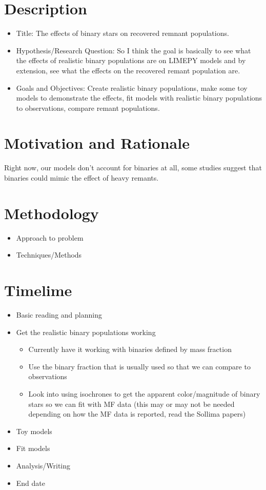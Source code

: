 \documentclass[12pt,letterpaper]{article}
\newcommand{\software}[1]{\textrm{\MakeUppercase{#1}}}
\begin{document}
\section{Description}
\begin{itemize}
	\item Title: The effects of binary stars on recovered remnant populations.
	\item Hypothesis/Research Question: So I think the goal is basically to see what the effects
	      of realistic binary populations are on \software{limepy} models and by extension, see
	      what the effects on the recovered remant population are.
	\item Goals and Objectives: Create realistic binary populations, make some toy models to
	      demonstrate the effects, fit models with realistic binary populations to observations,
	      compare remant populations.
\end{itemize}

\section{Motivation and Rationale}
Right now, our models don't account for binaries at all, some studies suggest that binaries could
mimic the effect of heavy remants.


\section{Methodology}
\begin{itemize}
	\item Approach to problem
	\item Techniques/Methods

\end{itemize}

\section{Timelime}
\begin{itemize}
	\item Basic reading and planning
	\item Get the realistic binary populations working
	      \begin{itemize}
		      \item Currently have it working with binaries defined by mass fraction
		      \item Use the binary fraction that is usually used so that we can compare to observations
		      \item Look into using isochrones to get the apparent color/magnitude of binary
		            stars so we can fit with MF data (this may or may not be needed depending on
		            how the MF data is reported, read the Sollima papers)
	      \end{itemize}
	\item Toy models
	\item Fit models
	\item Analysis/Writing
	\item End date
\end{itemize}
\end{document}
